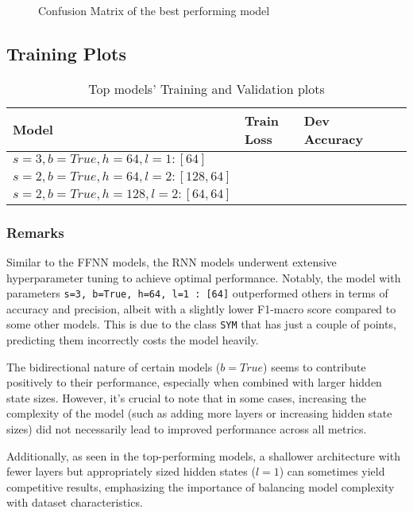 \begin{figure}[H]
\centering

\caption{Confusion Matrix of the best performing model}
\end{figure}


\subsection*{Training Plots}


\begin{table}[H]\sffamily
    \centering
    \setlength{\tabcolsep}{25pt}
    \begin{tabular}{l*4{C}@{}}
        \toprule
        Model & Train Loss & Dev Accuracy \\ 
        \midrule
        $s=3, b=True, h=64, l=1 : [64]$ &  &  \\ 
        $s=2, b=True, h=64, l=2 : [128,64]$ &  &  \\ 
        $s=2, b=True, h=128, l=2 : [64,64]$ &  &  \\ 
        \bottomrule 
    \end{tabular}
    \caption{Top models' Training and Validation plots}
\end{table}
\subsubsection{Remarks}
Similar to the FFNN models, the RNN models underwent extensive hyperparameter tuning to achieve optimal performance. Notably, the model with parameters \verb|s=3, b=True, h=64, l=1 : [64]| outperformed others in terms of accuracy and precision, albeit with a slightly lower F1-macro score compared to some other models. This is due to the class \verb|SYM| that has just a couple of points, predicting them incorrectly costs the model heavily.

The bidirectional nature of certain models ($b=True$) seems to contribute positively to their performance, especially when combined with larger hidden state sizes. However, it's crucial to note that in some cases, increasing the complexity of the model (such as adding more layers or increasing hidden state sizes) did not necessarily lead to improved performance across all metrics.

Additionally, as seen in the top-performing models, a shallower architecture with fewer layers but appropriately sized hidden states ($l=1$) can sometimes yield competitive results, emphasizing the importance of balancing model complexity with dataset characteristics.
